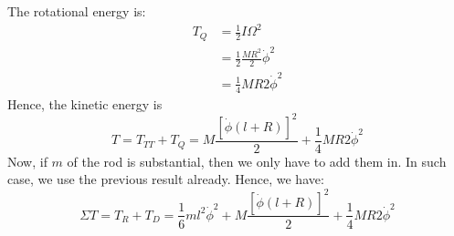 The rotational energy is:
\begin{equation}
    \begin{split}
        T_{Q} 
        & = \frac{1}{2} I \Omega^{2} \\
        & = \frac{1}{2} \frac{MR^{2}}{2} \dot{\phi}^{2}\\
        & = \frac{1}{4} MR{2}\dot{\phi}^{2} 
    \end{split}
\end{equation}
Hence, the kinetic energy is
\begin{equation}
    T = T_{TT} + T_{Q} = M \frac{\left[\dot{\phi}(l+R)\right]^{2}}{2} + \frac{1}{4} MR{2}\dot{\phi}^{2} 
\end{equation}
Now, if $m$ of the rod is substantial, then we only have to add them in. In such case, we use the previous result already.
Hence, we have:
\begin{equation}
    \Sigma T = T_{R} + T_{D} =  \frac{1}{6} ml^{2}\dot{\phi}^{2} +  M \frac{\left[\dot{\phi}(l+R)\right]^{2}}{2} + \frac{1}{4} MR{2}\dot{\phi}^{2} 
\end{equation}
